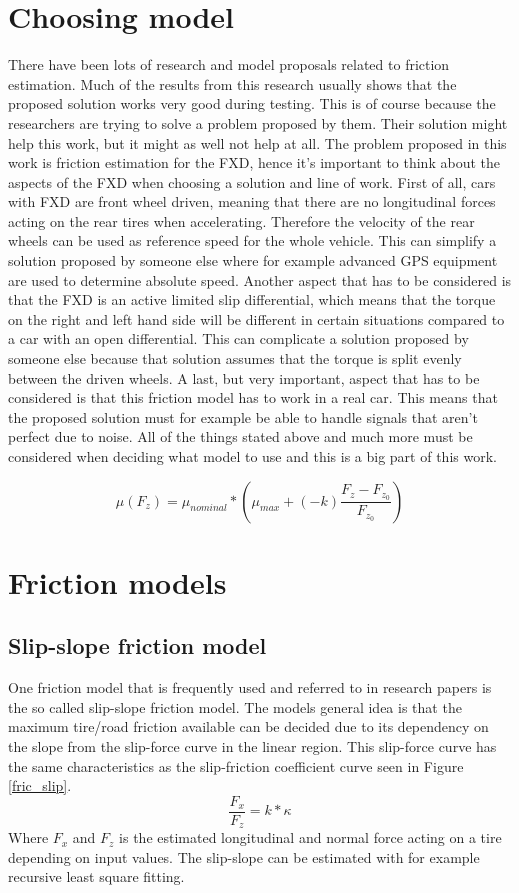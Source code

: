 \section{Choosing model}
There have been lots of research and model proposals related to friction estimation. Much of the results from this research usually shows that the proposed solution works very good during testing. This is of course because the researchers are trying to solve a problem proposed by them. Their solution might help this work, but it might as well not help at all. The problem proposed in this work is friction estimation for the FXD, hence it's important to think about the aspects of the FXD when choosing a solution and line of work. First of all, cars with FXD are front wheel driven, meaning that there are no longitudinal forces acting on the rear tires when accelerating. Therefore the velocity of the rear wheels can be used as reference speed for the whole vehicle. This can simplify a solution proposed by someone else where for example advanced GPS equipment are used to determine absolute speed. Another aspect that has to be considered is that the FXD is an active limited slip differential, which means that the torque on the right and left hand side will be different in certain situations compared to a car with an open differential. This can complicate a solution proposed by someone else because that solution assumes that the torque is split evenly between the driven wheels. A last, but very important, aspect that has to be considered is that this friction model has to work in a real car. This means that the proposed solution must for example be able to handle signals that aren't perfect due to noise. All of the things stated above and much more must be considered when deciding what model to use and this is a big part of this work.

\begin{equation}
\mu(F_{z})=\mu_{nominal}*(\mu_{max} + (-k)\frac{F_{z} - F_{z_{0}}}{F_{z_{0}}})
\end{equation}

\section{Friction models}

\subsection{Slip-slope friction model}

One friction model that is frequently used and referred to in research papers is the so called slip-slope friction model. The models general idea is that the maximum tire/road friction available can be decided due to its dependency on the slope from the slip-force curve in the linear region. This slip-force curve has the same characteristics as the slip-friction coefficient curve seen in Figure \ref{fric_slip}. 
\begin{equation}
	\dfrac{F_{x}}{F_{z}} = k*\kappa
\end{equation}
Where $ F_{x} $ and $ F_{z} $ is the estimated longitudinal and normal force acting on a tire depending on input values. The slip-slope can be estimated with for example recursive least square fitting.



